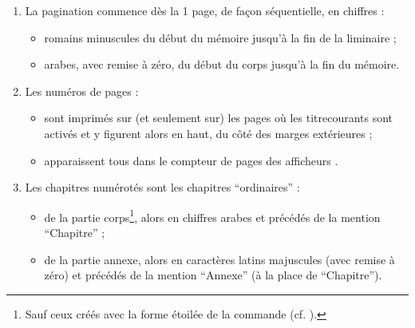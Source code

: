\begin{enumerate}
\begin{itemize}
  \item qui ouvrent les chapitres\footnote{%
      S'il s'agit d'un chapitre dont les pages sont numérotées, la page
      d'ouverture contient néanmoins son numéro en pied de page.%
    } ;
  \item de 4\ieme{} de couverture (et son recto).
  \end{itemize}
\item
  La \gls{pagination} commence dès la 1\iere{} page, de façon séquentielle, en
  chiffres :
  \begin{itemize}
  \item romains minuscules du début du mémoire jusqu'à la fin de la
    \gls{liminaire} ;
  \item arabes, avec remise à zéro, du début du corps jusqu'à la fin du
    mémoire.
  \end{itemize}
\item Les numéros de pages :
  \begin{itemize}
  \item sont imprimés sur (et seulement sur) les pages où les
    \glspl{titrecourant} sont activés et y figurent alors en haut, du côté des
    marges extérieures ;
  \item apparaissent tous dans le compteur de pages des afficheurs
    \pdf{}.
  \end{itemize}
\item
  Les chapitres numérotés sont les chapitres \enquote{ordinaires} :
  \begin{itemize}
  \item de la partie corps\footnote{Sauf ceux créés avec la forme étoilée de la
      commande  (cf. ).}, alors
    en chiffres arabes et précédés de la mention \enquote{Chapitre} ;
  \item de la partie annexe, alors en caractères latins majuscules (avec remise
    à zéro) et précédés de la mention \enquote{Annexe} (à la place de \enquote{Chapitre}).
  \end{itemize}
\end{enumerate}

